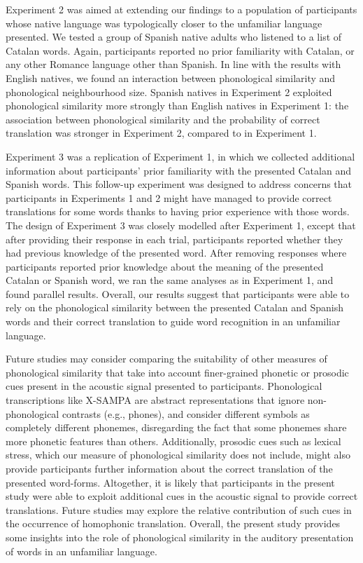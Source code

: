 \documentclass[
  man,
  longtable,
  nolmodern,
  notxfonts,
  notimes,
  colorlinks=true,linkcolor=blue,citecolor=blue,urlcolor=blue]{apa7}
\begin{document}
Experiment 2 was aimed at extending our findings to a population of
participants whose native language was typologically closer to the
unfamiliar language presented. We tested a group of Spanish native
adults who listened to a list of Catalan words. Again, participants
reported no prior familiarity with Catalan, or any other Romance
language other than Spanish. In line with the results with English
natives, we found an interaction between phonological similarity and
phonological neighbourhood size. Spanish natives in Experiment 2
exploited phonological similarity more strongly than English natives in
Experiment 1: the association between phonological similarity and the
probability of correct translation was stronger in Experiment 2,
compared to in Experiment 1.

Experiment 3 was a replication of Experiment 1, in which we collected
additional information about participants' prior familiarity with the
presented Catalan and Spanish words. This follow-up experiment was
designed to address concerns that participants in Experiments 1 and 2
might have managed to provide correct translations for some words thanks
to having prior experience with those words. The design of Experiment 3
was closely modelled after Experiment 1, except that after providing
their response in each trial, participants reported whether they had
previous knowledge of the presented word. After removing responses where
participants reported prior knowledge about the meaning of the presented
Catalan or Spanish word, we ran the same analyses as in Experiment 1,
and found parallel results. Overall, our results suggest that
participants were able to rely on the phonological similarity between
the presented Catalan and Spanish words and their correct translation to
guide word recognition in an unfamiliar language.

Future studies may consider comparing the suitability of other measures
of phonological similarity that take into account finer-grained phonetic
or prosodic cues present in the acoustic signal presented to
participants. Phonological transcriptions like X-SAMPA are abstract
representations that ignore non-phonological contrasts (e.g., phones),
and consider different symbols as completely different phonemes,
disregarding the fact that some phonemes share more phonetic features
than others. Additionally, prosodic cues such as lexical stress, which
our measure of phonological similarity does not include, might also
provide participants further information about the correct translation
of the presented word-forms. Altogether, it is likely that participants
in the present study were able to exploit additional cues in the
acoustic signal to provide correct translations. Future studies may
explore the relative contribution of such cues in the occurrence of
homophonic translation. Overall, the present study provides some
insights into the role of phonological similarity in the auditory
presentation of words in an unfamiliar language.
\end{document}
